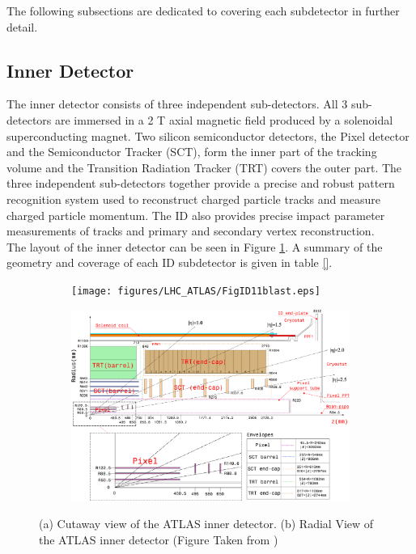 \indent The following subsections are dedicated to covering each subdetector in further detail. \\

\subsection{ Inner Detector }
\label{LHC:ID}

\indent The inner detector consists of three independent sub-detectors.  All 3 sub-detectors are immersed in a 2 T axial magnetic field produced by a solenoidal superconducting magnet.  Two silicon semiconductor detectors, the Pixel detector and the Semiconductor Tracker (SCT), form the inner part of the tracking volume and the Transition Radiation Tracker (TRT) covers the outer part.  The three independent sub-detectors together provide a precise and robust pattern recognition system used to reconstruct charged particle tracks and measure charged particle momentum.  The ID also provides precise impact parameter measurements of tracks and primary and secondary vertex reconstruction.   \\

\indent The layout of the inner detector can be seen in Figure \ref{LHC:fig:ATLASID}.  A summary of the geometry and coverage of each ID subdetector is given in table \ref{}.  \\

\begin{figure}[h!]
  \begin{center}
    \begin{subfigure}[a]{0.85\textwidth}   
	\texttt{[image: figures/LHC\_ATLAS/FigID11blast.eps]}
         \caption{ }
    \end{subfigure}
    \begin{subfigure}[b]{0.85\textwidth}   
	\includegraphics[width=\textwidth, angle=0]{figures/LHC_ATLAS/FigID26-mod-011107.eps}
         \caption{ }
    \end{subfigure}
\caption[Radial and Cutaway view of the ATLAS inner detector]{ (a) Cutaway view of the ATLAS inner detector. (b) Radial View of the ATLAS inner detector (Figure Taken from \cite{ATLAS_JINST}) \label{LHC:fig:ATLASID}}
\end{center}
\end{figure}

